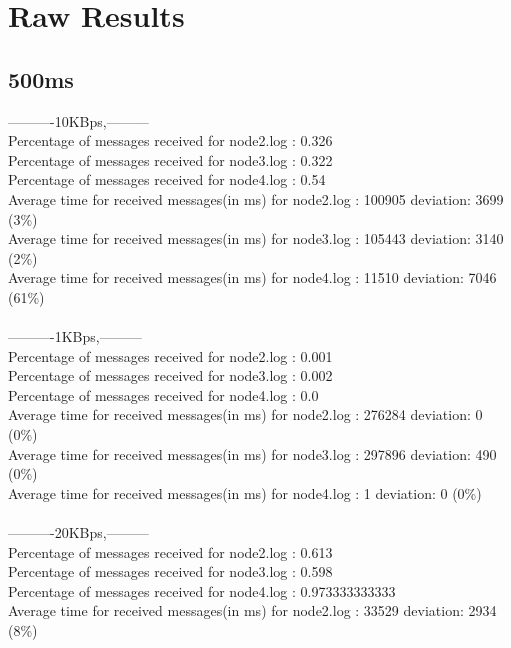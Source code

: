 \section {Raw Results} \label{RawResults}
    \subsection{500ms}\label{RawResults:500ms}
        ----------10KBps,---------\\
        Percentage of messages received for node2.log : 0.326\\
        Percentage of messages received for node3.log : 0.322\\
        Percentage of messages received for node4.log : 0.54\\
        Average time for received messages(in ms) for  node2.log : 100905   deviation: 3699 (3\%)\\
        Average time for received messages(in ms) for  node3.log : 105443   deviation: 3140 (2\%)\\
        Average time for received messages(in ms) for  node4.log : 11510    deviation: 7046 (61\%)\\\\
        ----------1KBps,---------\\
        Percentage of messages received for node2.log : 0.001\\
        Percentage of messages received for node3.log : 0.002\\
        Percentage of messages received for node4.log : 0.0\\
        Average time for received messages(in ms) for  node2.log : 276284   deviation: 0 (0\%)\\
        Average time for received messages(in ms) for  node3.log : 297896   deviation: 490 (0\%)\\
        Average time for received messages(in ms) for  node4.log : 1    deviation: 0 (0\%)\\\\
        ----------20KBps,---------\\
        Percentage of messages received for node2.log : 0.613\\
        Percentage of messages received for node3.log : 0.598\\
        Percentage of messages received for node4.log : 0.973333333333\\
        Average time for received messages(in ms) for  node2.log : 33529    deviation: 2934 (8\%)\\

